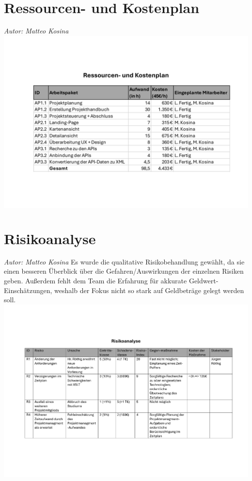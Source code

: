 \documentclass[12pt]{article}
\begin{document}
\section{Ressourcen- und Kostenplan}
{\it Autor: Matteo Kosina}
\newline
\includegraphics[width=\textwidth]{Planungsdokumente/graphics/Ressourcenplan.pdf}

\section{Risikoanalyse}
{\it Autor: Matteo Kosina}
\newline
Es wurde die qualitative Risikobehandlung gewählt, da sie einen besseren Überblick über die Gefahren/Auswirkungen der einzelnen Risiken geben. Außerdem fehlt dem Team die Erfahrung für akkurate Geldwert-Einschätzungen, weshalb der Fokus nicht so stark auf Geldbeträge gelegt werden soll.
\newline
\includegraphics[width=\textwidth]{Planungsdokumente/graphics/Risikoanalyse.pdf}
\end{document}
